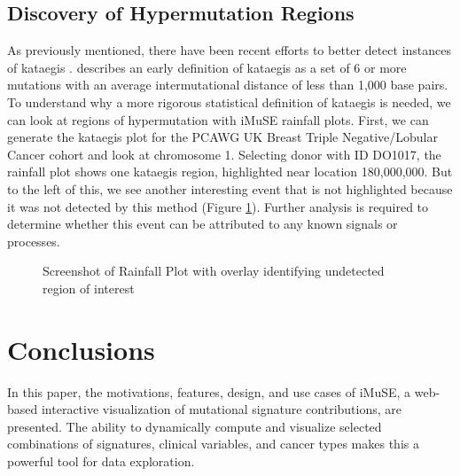 \documentclass[12pt, letterpaper]{article}
\begin{document}
\subsection{Discovery of Hypermutation Regions}
As previously mentioned, there have been recent efforts to better detect instances of kataegis \citep{yousif2018origins}.
\citet{alexandrov2013signatures} describes an early definition of kataegis as a set of 6 or more mutations with an average intermutational distance of less than 1,000 base pairs.
To understand why a more rigorous statistical definition of kataegis is needed, we can look at regions of hypermutation with iMuSE rainfall plots.
First, we can generate the kataegis plot for the PCAWG UK Breast Triple Negative/Lobular Cancer cohort and look at chromosome 1.
Selecting donor with ID DO1017, the rainfall plot shows one kataegis region, highlighted near location 180,000,000. 
But to the left of this, we see another interesting event that is not highlighted because it was not detected by this method (Figure \ref{fig:caseStudy3}).
Further analysis is required to determine whether this event can be attributed to any known signals or processes.
\begin{figure}[h]
    \centering
    \caption{Screenshot of Rainfall Plot with overlay identifying undetected region of interest}
    \label{fig:caseStudy3}
\end{figure}


\section{Conclusions}
In this paper, the motivations, features, design, and use cases of iMuSE, a web-based interactive visualization of mutational signature contributions, are presented. 
The ability to dynamically compute and visualize selected combinations of signatures, clinical variables, and cancer types makes this a powerful tool for data exploration.
\end{document}
